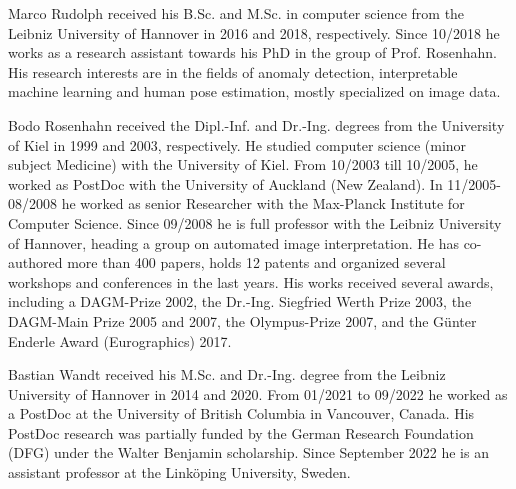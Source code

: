 \documentclass[journal]{IEEEtran}
\begin{document}

\begin{IEEEbiography}{Marco Rudolph}
	 received his B.Sc. and M.Sc. in computer science from the Leibniz University of Hannover in 2016 and 2018, respectively. Since 10/2018 he works as a research assistant
towards his PhD in the group of Prof. Rosenhahn. His
research interests are in the fields of anomaly detection, interpretable machine learning and human pose estimation, mostly specialized on image data.
\end{IEEEbiography}


\begin{IEEEbiography}{Bodo Rosenhahn}
	 received the Dipl.-Inf. and Dr.-Ing.
degrees from the University of Kiel in 1999 and 2003,
respectively. He studied computer science (minor
subject Medicine) with the University of Kiel. From
10/2003 till 10/2005, he worked as PostDoc with the
University of Auckland (New Zealand). In 11/2005-08/2008 he worked as senior Researcher with the Max-Planck Institute for Computer
Science. Since 09/2008 he is full professor with the
Leibniz University of Hannover, heading a group on
automated image interpretation. He has co-authored more than 400 papers, holds
12 patents and organized several workshops and conferences in the last years.
His works received several awards, including a DAGM-Prize 2002, the Dr.-Ing.
Siegfried Werth Prize 2003, the DAGM-Main Prize 2005 and
2007, the Olympus-Prize 2007, and the Günter Enderle Award (Eurographics)
2017.
\end{IEEEbiography}


\begin{IEEEbiography}{Bastian Wandt}
	 received his M.Sc. and Dr.-Ing. degree from the Leibniz University of Hannover in 2014 and 2020. From 01/2021 to 09/2022 he worked as a PostDoc at the University of British Columbia in Vancouver, Canada. His PostDoc research was partially funded by the German Research Foundation (DFG) under the Walter Benjamin scholarship. Since September 2022 he is an assistant professor at the Linköping University, Sweden.
\end{IEEEbiography}
\end{document}
